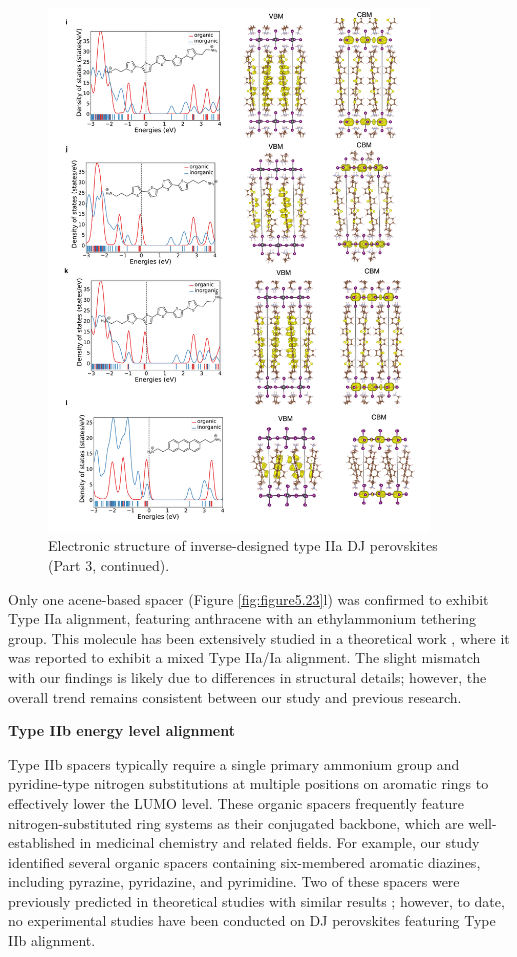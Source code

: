 \begin{figure}[htbp]
    \ContinuedFloat
    \centering
    \includegraphics[width=0.9\textwidth]{figures/synthesis-feasibility/figure5-23-3.png}
    \caption{Electronic structure of inverse-designed type IIa DJ perovskites (Part 3, continued).}
\end{figure}

Only one acene-based spacer (Figure \ref{fig:figure5.23}l) was confirmed to exhibit Type IIa alignment, featuring anthracene with an ethylammonium tethering group. This molecule has been extensively studied in a theoretical work \cite{RN2}, where it was reported to exhibit a mixed Type IIa/Ia alignment. The slight mismatch with our findings is likely due to differences in structural details; however, the overall trend remains consistent between our study and previous research.


\textbf{Type IIb energy level alignment}

Type IIb spacers typically require a single primary ammonium group and pyridine-type nitrogen substitutions at multiple positions on aromatic rings to effectively lower the LUMO level. These organic spacers frequently feature nitrogen-substituted ring systems as their conjugated backbone, which are well-established in medicinal chemistry and related fields. For example, our study identified several organic spacers containing six-membered aromatic diazines, including pyrazine, pyridazine, and pyrimidine. Two of these spacers were previously predicted in theoretical studies with similar results \cite{RN617}; however, to date, no experimental studies have been conducted on DJ perovskites featuring Type IIb alignment.

